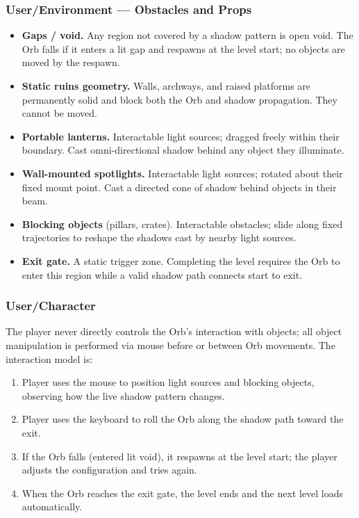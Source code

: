 \documentclass[11pt, letterpaper]{article}
\begin{document}
        \subsubsection{User/Environment --- Obstacles and Props}
        \begin{itemize}[leftmargin=1.5em, itemsep=2pt]
            \item \textbf{Gaps / void.} Any region not covered by a shadow pattern is
                  open void. The Orb falls if it enters a lit gap and respawns at the
                  level start; no objects are moved by the respawn.
            \item \textbf{Static ruins geometry.} Walls, archways, and raised platforms
                  are permanently solid and block both the Orb and shadow propagation.
                  They cannot be moved.
            \item \textbf{Portable lanterns.} Interactable light sources; dragged freely
                  within their boundary. Cast omni-directional shadow behind any object
                  they illuminate.
            \item \textbf{Wall-mounted spotlights.} Interactable light sources; rotated
                  about their fixed mount point. Cast a directed cone of shadow behind
                  objects in their beam.
            \item \textbf{Blocking objects} (pillars, crates). Interactable obstacles;
                  slide along fixed trajectories to reshape the shadows cast by nearby
                  light sources.
            \item \textbf{Exit gate.} A static trigger zone. Completing the level
                  requires the Orb to enter this region while a valid shadow path
                  connects start to exit.
        \end{itemize}

        \subsubsection{User/Character}
        The player never directly controls the Orb's interaction with objects; all
        object manipulation is performed via mouse before or between Orb movements.
        The interaction model is:

        \begin{enumerate}[leftmargin=1.5em, itemsep=2pt]
            \item Player uses the mouse to position light sources and blocking objects,
                  observing how the live shadow pattern changes.
            \item Player uses the keyboard to roll the Orb along the shadow path toward
                  the exit.
            \item If the Orb falls (entered lit void), it respawns at the level start;
                  the player adjusts the configuration and tries again.
            \item When the Orb reaches the exit gate, the level ends and the next
                  level loads automatically.
        \end{enumerate}
\end{document}
